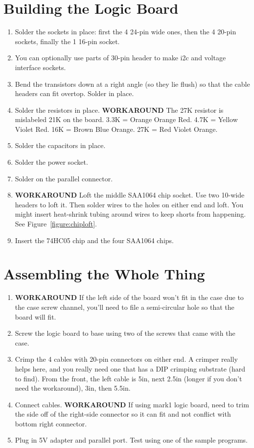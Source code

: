 \documentclass[11pt]{article}
\begin{document}
\section{Building the Logic Board}
\begin{enumerate}
\item Solder the sockets in place:  first the 4 24-pin wide ones, then
      the 4 20-pin sockets, finally the 1 16-pin socket.
\item You can optionally use parts of 30-pin header to make i2c and voltage
      interface sockets.
\item Bend the transistors down at a right angle (so they lie flush) 
      so that the cable headers can fit overtop.  Solder in place.
\item Solder the resistors in place.  
      {\bf WORKAROUND} The 27K resistor is mislabeled
      21K on the board.  3.3K = Orange Orange Red. 
      4.7K = Yellow Violet Red.  16K = Brown Blue Orange.
      27K = Red Violet Orange.
\item Solder the capacitors in place.
\item Solder the power socket.
\item Solder on the parallel connector.
\item {\bf WORKAROUND} Loft the middle SAA1064 chip socket.  Use two 10-wide
      headers to loft it.  Then solder wires to the holes on either
      end and loft.  You might insert heat-shrink tubing around wires
      to keep shorts from happening.  See Figure~\ref{figure:chiploft}.
\item Insert the 74HC05 chip and the four SAA1064 chips.

\end{enumerate}

\pagebreak

\section{Assembling the Whole Thing}
\begin{enumerate}
\item {\bf WORKAROUND} If the left side of the board won't fit in the
      case due to the case screw channel, you'll need to file a 
      semi-circular hole so that the board will fit.
\item Screw the logic board to base using two of the screws that
      came with the case.
\item Crimp the 4 cables with 20-pin connectors on either end.
      A crimper really helps here, and you really need one that
      has a DIP crimping substrate (hard to find).
      From the front, the left cable is 5in, next 2.5in (longer
      if you don't need the workaround), 3in, then 5.5in.      
\item Connect cables.  {\bf WORKAROUND}  If using mark1 logic board,
      need to trim the side off of the right-side connector
      so it can fit and not conflict with bottom right connector.
\item Plug in 5V adapter and parallel port.  Test using one
      of the sample programs.
\end{enumerate}
\end{document}
